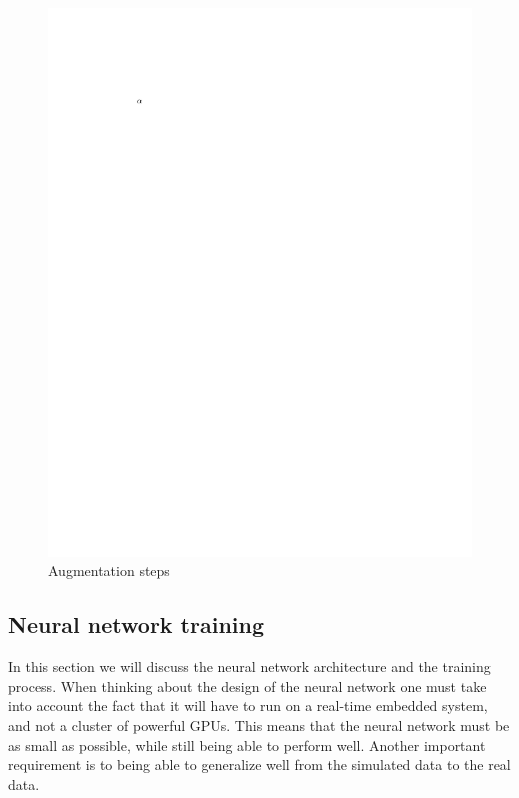 \documentclass[a4paper,12pt,sort&compress]{article}
\begin{document}
    \begin{figure}
        \centering
        \includegraphics[width=0.6\linewidth]{a.pdf}
        \caption{Augmentation steps}
        \label{fig:augmentation_steps}
    \end{figure}

        
\subsection{Neural network training}
    In this section we will discuss the neural network architecture and the training process. When
    thinking about the design of the neural network one must take into account the fact that it will
    have to run on a real-time embedded system, and not a cluster of powerful GPUs. This means that 
    the neural network must be as small as possible, while still being able to perform well. Another
    important requirement is to being able to generalize well from the simulated data to the real data.
\end{document}
